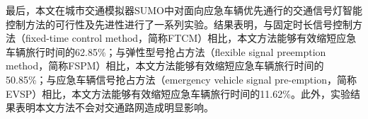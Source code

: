 最后，本文在城市交通模拟器SUMO中对面向应急车辆优先通行的交通信号灯智能控制方法的可行性及先进性进行了一系列实验。结果表明，与固定时长信号控制方法（fixed-time control method，简称FTCM）相比，本文方法能够有效缩短应急车辆旅行时间的62.85\%；与弹性型号抢占方法（flexible signal preemption  method，简称FSPM）相比，本文方法能够有效缩短应急车辆旅行时间的50.85\%；与应急车辆信号抢占方法（emergency vehicle signal pre-emption，简称EVSP）相比，本文方法能够有效缩短应急车辆旅行时间的11.62\%。此外，实验结果表明本文方法不会对交通路网造成明显影响。


\hspace{-0.5cm}
